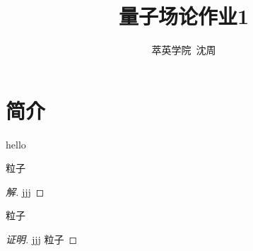 \documentclass{qftemplate}
\author{萃英学院\ 沈周}
\title{量子场论作业1}
\begin{document}
\maketitle
\section{简介}
hello
\begin{question}[宇宙超级无敌粒子]
    粒子    
\end{question}
\begin{proof}[解]
    jjj 
\end{proof}
\begin{question}[宇宙超级无敌粒子]
    粒子    
\end{question}
\begin{proof}[证明]
    jjj 粒子    
\end{proof}
\end{document}
